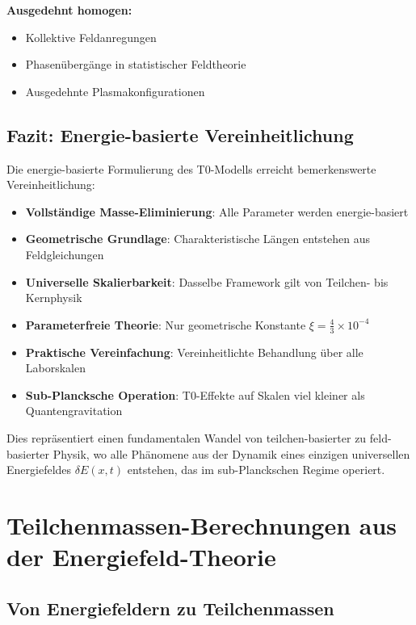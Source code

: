 \documentclass[12pt,a4paper]{report}
\begin{document}
	\textbf{Ausgedehnt homogen:}
	\begin{itemize}
		\item Kollektive Feldanregungen
		\item Phasenübergänge in statistischer Feldtheorie
		\item Ausgedehnte Plasmakonfigurationen
	\end{itemize}
	
	\section{Fazit: Energie-basierte Vereinheitlichung}
	\label{sec:conclusion_energy_unification}
	
	Die energie-basierte Formulierung des T0-Modells erreicht bemerkenswerte Vereinheitlichung:
	
	\begin{itemize}
		\item \textbf{Vollständige Masse-Eliminierung}: Alle Parameter werden energie-basiert
		\item \textbf{Geometrische Grundlage}: Charakteristische Längen entstehen aus Feldgleichungen
		\item \textbf{Universelle Skalierbarkeit}: Dasselbe Framework gilt von Teilchen- bis Kernphysik
		\item \textbf{Parameterfreie Theorie}: Nur geometrische Konstante $\xi = \frac{4}{3} \times 10^{-4}$
		\item \textbf{Praktische Vereinfachung}: Vereinheitlichte Behandlung über alle Laborskalen
		\item \textbf{Sub-Plancksche Operation}: T0-Effekte auf Skalen viel kleiner als Quantengravitation
	\end{itemize}
	
	Dies repräsentiert einen fundamentalen Wandel von teilchen-basierter zu feld-basierter Physik, wo alle Phänomene aus der Dynamik eines einzigen universellen Energiefeldes $\delta E(x,t)$ entstehen, das im sub-Planckschen Regime operiert.

\chapter{Teilchenmassen-Berechnungen aus der Energiefeld-Theorie}
\label{chap:particle_mass_calculations}

\section{Von Energiefeldern zu Teilchenmassen}
\label{sec:energy_fields_to_masses}
\end{document}
